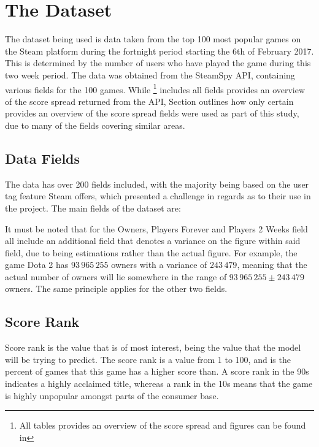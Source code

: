 \documentclass[dataset.tex]{subfiles}
\begin{document}
\section{The Dataset} %
\label{sec:dataset}
The dataset being used is data taken from the top 100 most popular games on the
Steam platform during the fortnight period starting the 6th of February 2017.
This is determined by the number of users who have played the game during this
two week period. The data was obtained from the SteamSpy API, containing various
fields for the 100 games. While  \footnote{All tables provides an overview of the score spread
and figures can be found in } includes all fields provides an overview of the score spread
returned from the API, Section outlines how only certain provides an overview of the score spread
fields were used as part of this study, due to many of the fields covering
similar areas.

\subsection{Data Fields} %
\label{sub:data_fields}
The data has over 200 fields included, with the majority being based on the user
tag feature Steam offers, which presented a challenge in regards as to their use
in the project. The main fields of the dataset are:

It must be noted that for the Owners, Players Forever and Players 2 Weeks field
all include an additional field that denotes a variance on the figure within
said field, due to being estimations rather than the actual figure. For example,
the game Dota 2 has \(93\,965\,255\) owners with a variance of \(243\,479\),
meaning that the actual number of owners will lie somewhere in the range of
\(93\,965\,255 \pm 243\,479 \) owners. The same principle applies for the other
two fields.

\subsection{Score Rank} %
\label{sub:score_rank}
Score rank is the value that is of most interest, being the value that the model
will be trying to predict. The score rank is a value from 1 to 100, and is the
percent of games that this game has a higher score than. A score rank in the 90s
indicates a highly acclaimed title, whereas a rank in the 10s means that the
game is highly unpopular amongst parts of the consumer base. 
\end{document}
